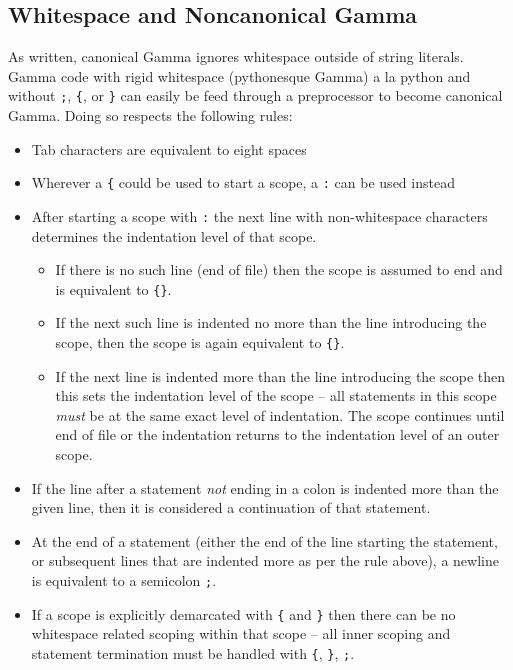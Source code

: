 \subsection{Whitespace and Noncanonical Gamma}
As written, canonical Gamma ignores whitespace outside of string literals. Gamma code with rigid whitespace (pythonesque Gamma) a la python and without \verb!;!, \verb!{!, or \verb!}! can easily be feed through a preprocessor to become canonical Gamma. Doing so respects the following rules:
\begin{itemize}
\item Tab characters are equivalent to eight spaces
\item Wherever a \verb!{! could be used to start a scope, a \verb!:! can be used instead
\item After starting a scope with \verb!:! the next line with non-whitespace characters determines the indentation level of that scope.
\begin{itemize}
\item If there is no such line (end of file) then the scope is assumed to end and is equivalent to \verb!{}!.
\item If the next such line is indented no more than the line introducing the scope, then the scope is again equivalent to \verb!{}!.
\item If the next line is indented more than the line introducing the scope then this sets the indentation level of the scope -- all statements in this scope \emph{must} be at the same exact level of indentation. The scope continues until end of file or the indentation returns to the indentation level of an outer scope.
\end{itemize}
\item If the line after a statement \emph{not} ending in a colon is indented more than the given line, then it is considered a continuation of that statement.
\item At the end of a statement (either the end of the line starting the statement, or subsequent lines that are indented more as per the rule above), a newline is equivalent to a semicolon \verb!;!.
\item If a scope is explicitly demarcated with \verb!{! and \verb!}! then there can be no whitespace related scoping within that scope -- all inner scoping and statement termination must be handled with \verb!{!, \verb!}!, \verb!;!. 
\end{itemize}

